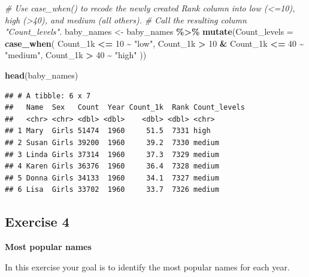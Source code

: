 \documentclass[
]{book}
\newenvironment{Shaded}{\begin{snugshade}}{\end{snugshade}}
\newcommand{\CommentTok}[1]{\textcolor[rgb]{0.56,0.35,0.01}{\textit{#1}}}
\newcommand{\DataTypeTok}[1]{\textcolor[rgb]{0.13,0.29,0.53}{#1}}
\newcommand{\DecValTok}[1]{\textcolor[rgb]{0.00,0.00,0.81}{#1}}
\newcommand{\KeywordTok}[1]{\textcolor[rgb]{0.13,0.29,0.53}{\textbf{#1}}}
\newcommand{\NormalTok}[1]{#1}
\newcommand{\OperatorTok}[1]{\textcolor[rgb]{0.81,0.36,0.00}{\textbf{#1}}}
\newcommand{\StringTok}[1]{\textcolor[rgb]{0.31,0.60,0.02}{#1}}
\begin{document}
\begin{Shaded}
\begin{Highlighting}[]
\CommentTok{\# Use case\_when() to recode the newly created Rank column into low (\textless{}=10), high (\textgreater{}40), and medium (all others).}
\CommentTok{\# Call the resulting column "Count\_levels".}
\NormalTok{baby\_names \textless{}{-}}
\StringTok{  }\NormalTok{baby\_names }\OperatorTok{\%\textgreater{}\%}
\StringTok{  }\KeywordTok{mutate}\NormalTok{(}\DataTypeTok{Count\_levels =} \KeywordTok{case\_when}\NormalTok{(}
\NormalTok{                            Count\_1k }\OperatorTok{\textless{}=}\StringTok{ }\DecValTok{10}                  \OperatorTok{\textasciitilde{}}\StringTok{ "low"}\NormalTok{,}
\NormalTok{                            Count\_1k  }\OperatorTok{\textgreater{}}\StringTok{ }\DecValTok{10} \OperatorTok{\&}\StringTok{ }\NormalTok{Count\_1k }\OperatorTok{\textless{}=}\StringTok{ }\DecValTok{40} \OperatorTok{\textasciitilde{}}\StringTok{ "medium"}\NormalTok{,}
\NormalTok{                            Count\_1k  }\OperatorTok{\textgreater{}}\StringTok{ }\DecValTok{40}                  \OperatorTok{\textasciitilde{}}\StringTok{ "high"}
\NormalTok{                            ))}

\KeywordTok{head}\NormalTok{(baby\_names)                            }
\end{Highlighting}
\end{Shaded}

\begin{verbatim}
## # A tibble: 6 x 7
##   Name  Sex   Count  Year Count_1k  Rank Count_levels
##   <chr> <chr> <dbl> <dbl>    <dbl> <dbl> <chr>       
## 1 Mary  Girls 51474  1960     51.5  7331 high        
## 2 Susan Girls 39200  1960     39.2  7330 medium      
## 3 Linda Girls 37314  1960     37.3  7329 medium      
## 4 Karen Girls 36376  1960     36.4  7328 medium      
## 5 Donna Girls 34133  1960     34.1  7327 medium      
## 6 Lisa  Girls 33702  1960     33.7  7326 medium
\end{verbatim}

\hypertarget{exercise-4}{%
\subsection{Exercise 4}\label{exercise-4}}

\textbf{Most popular names}

In this exercise your goal is to identify the most popular names for each year.
\end{document}
